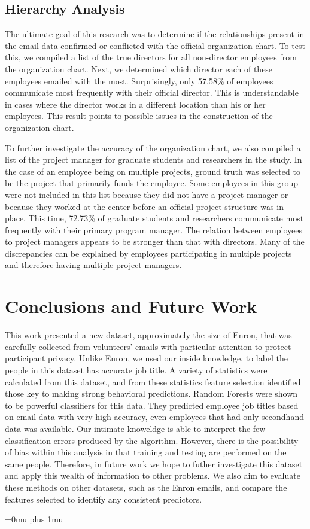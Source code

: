 \documentclass{article}
\begin{document}
\subsection{Hierarchy Analysis}
The ultimate goal of this research was to determine if the relationships present in the email data confirmed or conflicted with the official organization chart.  To test this, we compiled a list of the true directors for all non-director employees from the organization chart.  Next, we determined which director each of these employees emailed with the most.  Surprisingly, only 57.58\% of employees communicate most frequently with their official director.  This is understandable in cases where the director works in a different location than his or her employees.  This result points to possible issues in the construction of the organization chart.
\par
To further investigate the accuracy of the organization chart, we also compiled a list of the project manager for graduate students and researchers in the study.  In the case of an employee being on multiple projects, ground truth was selected to be the project that primarily funds the employee.  Some employees in this group were not included in this list because they did not have a project manager or because they worked at the center before an official project structure was in place.  This time, 72.73\% of graduate students and researchers communicate most frequently with their primary program manager.  The relation between employees to project managers appears to be stronger than that with directors.  Many of the discrepancies can be explained by employees participating in multiple projects and therefore having multiple project managers.


\section{Conclusions and Future Work} \label{Conclusions}
This work presented a new dataset, approximately the size of Enron, that was carefully collected from volunteers' emails with particular attention to protect participant privacy.  Unlike Enron, we used our inside knowledge, to label the people in this dataset has accurate job title.  A variety of statistics were calculated from this dataset, and from these statistics feature selection identified those key to making strong behavioral predictions.  Random Forests were shown to be powerful classifiers for this data.  They predicted employee job titles based on email data with very high accuracy, even employees that had only secondhand data was available.  Our intimate knoweldge is able to interpret the few classification errors produced by the algorithm.  However, there is the possibility of bias within this analysis in that training and testing are performed on the same people.  Therefore, in future work we hope to futher investigate this dataset and apply this wealth of information to other problems.  We also aim to evaluate these methods on other datasets, such as the Enron emails, and compare the features selected to identify any consistent predictors.


\clearpage
\Urlmuskip=0mu plus 1mu\relax


\end{document}

